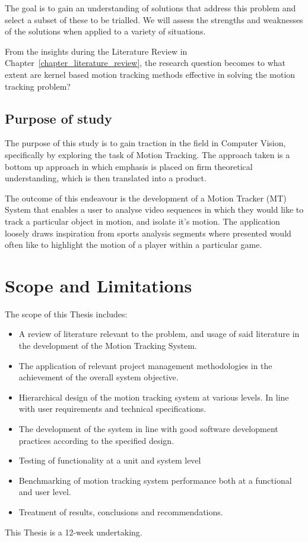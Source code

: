 The goal is to gain an understanding of solutions that address this problem and
select a subset of these to be trialled. We will assess the strengths and
weaknesses of the solutions when applied to a variety of situations.

From the insights during the Literature Review in Chapter~\ref{chapter_literature_review}, the
research question becomes to what extent are kernel based motion tracking
methods effective in solving the motion tracking problem?

\subsection{Purpose of study}\label{introduction_purpose}
The purpose of this study is to gain traction in the field in Computer Vision,
specifically by exploring the task of Motion Tracking. The approach taken is a
bottom up approach in which emphasis is placed on firm theoretical
understanding, which is then translated into a product.

The outcome of this endeavour is the development of a Motion Tracker
(MT) System that enables a user to analyse video sequences in which they would like
to track a particular object in motion, and isolate it's motion. The application
loosely draws inspiration from sports analysis segments where presented would often like
to highlight the motion of a player within a particular game.

\section{Scope and Limitations}\label{introduction_scope}
The scope of this Thesis includes: 
\begin{itemize}
    \item A review of literature relevant to the problem, and usage of
        said literature in the development of the Motion Tracking System.
    \item The application of relevant project management methodologies in the
        achievement of the overall system objective.
    \item Hierarchical design of the motion tracking system at various levels.
        In line with user requirements and technical specifications.
    \item The development of the system in line with good software development
        practices according to the specified design.
    \item Testing of functionality at a unit and system level
    \item Benchmarking of motion tracking system performance both at a
        functional and user level.
    \item Treatment of results, conclusions and recommendations.
\end{itemize}
This Thesis is a 12-week undertaking.

